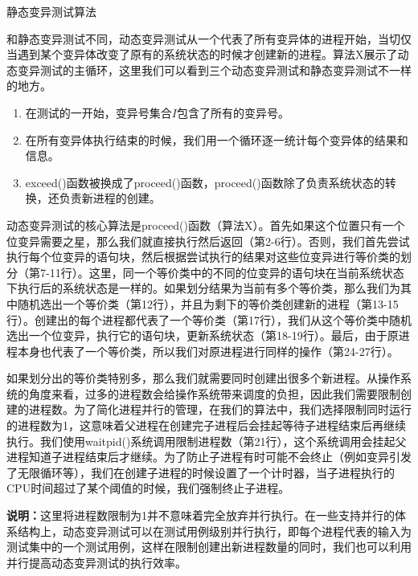 \documentclass[nofonts]{ctexrep}
\begin{document}
\begin{algorithm}[t]
\caption{静态变异测试算法}
\label{alg:static}

\end{algorithm}
和静态变异测试不同，动态变异测试从一个代表了所有变异体的进程开始，当切仅当遇到某个变异体改变了原有的系统状态的时候才创建新的进程。算法X展示了动态变异测试的主循环，这里我们可以看到三个动态变异测试和静态变异测试不一样的地方。
\begin{enumerate}
\item
在测试的一开始，变异号集合$I$包含了所有的变异号。
\item
在所有变异体执行结束的时候，我们用一个循环逐一统计每个变异体的结果和信息。
\item
exceed()函数被换成了proceed()函数，proceed()函数除了负责系统状态的转换，还负责新进程的创建。
\end{enumerate}

动态变异测试的核心算法是proceed()函数（算法X）。首先如果这个位置只有一个位变异需要之星，那么我们就直接执行然后返回（第2-6行）。否则，我们首先尝试执行每个位变异的语句块，然后根据尝试执行的结果对这些位变异进行等价类的划分（第7-11行）。这里，同一个等价类中的不同的位变异的语句块在当前系统状态下执行后的系统状态是一样的。如果划分结果为当前有多个等价类，那么我们为其中随机选出一个等价类（第12行），并且为剩下的等价类创建新的进程（第13-15行）。创建出的每个进程都代表了一个等价类（第17行），我们从这个等价类中随机选出一个位变异，执行它的语句块，更新系统状态（第18-19行）。最后，由于原进程本身也代表了一个等价类，所以我们对原进程进行同样的操作（第24-27行）。

如果划分出的等价类特别多，那么我们就需要同时创建出很多个新进程。从操作系统的角度来看，过多的进程数会给操作系统带来调度的负担，因此我们需要限制创建的进程数。为了简化进程并行的管理，在我们的算法中，我们选择限制同时运行的进程数为1，这意味着父进程在创建完子进程后会挂起等待子进程结束后再继续执行。我们使用waitpid()系统调用限制进程数（第21行），这个系统调用会挂起父进程知道子进程结束后才继续。为了防止子进程有时可能不会终止（例如变异引发了无限循环等），我们在创建子进程的时候设置了一个计时器，当子进程执行的CPU时间超过了某个阈值的时候，我们强制终止子进程。

\textbf{说明：}这里将进程数限制为1并不意味着完全放弃并行执行。在一些支持并行的体系结构上，动态变异测试可以在测试用例级别并行执行，即每个进程代表的输入为测试集中的一个测试用例，这样在限制创建出新进程数量的同时，我们也可以利用并行提高动态变异测试的执行效率。
\end{document}
